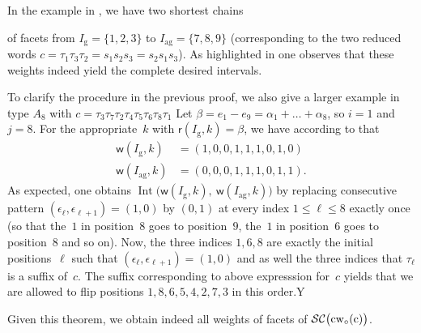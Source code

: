 \documentclass[ALCO,Unicode,ThmDefs]{cedram}
\newcommand{\subwordComplex}{\mathcal{SC}}
\newcommand{\clusterComplex}{\subwordComplex\big(\cw{c}\big)}
\newcommand{\greedy}{I_{\operatorname{g}}}
\newcommand{\antigreedy}{I_{\operatorname{ag}}}
\newcommand{\sq}[1]{{\rm #1}}
\newcommand{\sfr}{\mathsf{r}}
\newcommand{\sfw}{\mathsf{w}}
\newcommand{\wo}{{w_\circ}}
\newcommand{\sw}[2]{\sq{#1}(\sq{#2})}
\newcommand{\cwo}[1]{\sw{\wo}{#1}}
\newcommand{\cw}[1]{\sq{#1}\cwo{#1}}
\newcommand{\Root}[2]{{\sfr}(#1,#2)}
\newcommand{\Weight}[2]{{\sfw}(#1,#2)}
\newcommand{\IntervalWeight}[1]{{\operatorname{Int}\big(\Weight{\greedy}{#1},\ \Weight{\antigreedy}{#1}\big)}}
\begin{document}
\begin{exem}\label{ex:shortestpaths}
In the example in , we have two shortest chains
\begin{center}
\end{center} of facets from $\greedy = \{1,2,3\}$ to $\antigreedy = \{7,8,9\}$ (corresponding to the two reduced words $c = \tau_1\tau_3\tau_2 = s_1s_2s_3 = s_2s_1s_3$). As highlighted in  one observes that these weights indeed yield the complete desired intervals.

To clarify the procedure in the previous proof, we also give a larger example in type $A_8$ with $c = \tau_3\tau_7\tau_2\tau_4\tau_5\tau_6\tau_8\tau_1$ Let $\beta = e_1 - e_9 = \alpha_1 + \dots + \alpha_8$, so $i=1$ and $j=8$. For the appropriate~$k$ with $\Root{\greedy}{k} = \beta$, we have according to  that
\begin{align*}
\Weight{\greedy}{k} &= (1,0,0,1,1,1,0,1,0) \\
\Weight{\antigreedy}{k} &= (0,0,0,1,1,1,0,1,1).
\end{align*}
As expected, one obtains $\IntervalWeight{k}$ by replacing consecutive pattern $(\epsilon_\ell,\epsilon_{\ell+1}) = (1,0)$ by $(0,1)$ at every index $1 \leq \ell \leq 8$ exactly once (so that the~$1$ in position~$8$ goes to position~$9$, the~$1$ in position~$6$ goes to position~$8$ and so on). Now, the three indices $1,6,8$ are exactly the initial positions~$\ell$ such that $(\epsilon_\ell,\epsilon_{\ell+1}) = (1,0)$ and as well the three indices that $\tau_\ell$ is a suffix of~$c$. The suffix corresponding to above expresssion for~$c$ yields that we are allowed to flip positions $1,8,6,5,4,2,7,3$ in this order.Y
\end{exem}

Given this theorem, we obtain indeed all weights of facets of $\clusterComplex$.
\end{document}
